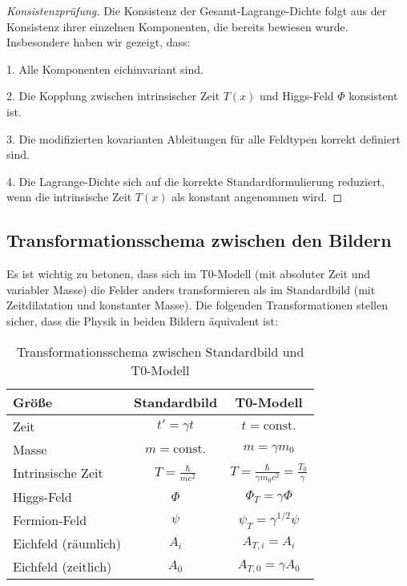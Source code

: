 \documentclass{article}
\theoremstyle{definition}
\theoremstyle{remark}
\newcommand{\Tfield}{T(x)} %
\begin{document}
		\begin{proof}[Konsistenzprüfung]
			Die Konsistenz der Gesamt-Lagrange-Dichte folgt aus der Konsistenz ihrer einzelnen Komponenten, die bereits bewiesen wurde. Insbesondere haben wir gezeigt, dass:
			
			1. Alle Komponenten eichinvariant sind.
			
			2. Die Kopplung zwischen intrinsischer Zeit $\Tfield$ und Higgs-Feld $\Phi$ konsistent ist.
			
			3. Die modifizierten kovarianten Ableitungen für alle Feldtypen korrekt definiert sind.
			
			4. Die Lagrange-Dichte sich auf die korrekte Standardformulierung reduziert, wenn die intrinsische Zeit $\Tfield$ als konstant angenommen wird.
		\end{proof}
		
		\subsection{Transformationsschema zwischen den Bildern}
		
		Es ist wichtig zu betonen, dass sich im T0-Modell (mit absoluter Zeit und variabler Masse) die Felder anders transformieren als im Standardbild (mit Zeitdilatation und konstanter Masse). Die folgenden Transformationen stellen sicher, dass die Physik in beiden Bildern äquivalent ist:
		
		\begin{table}[h]
			\centering
			\begin{tabular}{|l|c|c|}
				\hline
				\textbf{Größe} & \textbf{Standardbild} & \textbf{T0-Modell} \\
				\hline
				Zeit & $t' = \gamma t$ & $t = \text{const.}$ \\
				Masse & $m = \text{const.}$ & $m = \gamma m_0$ \\
				Intrinsische Zeit & $T = \frac{\hbar}{mc^2}$ & $T = \frac{\hbar}{\gamma m_0c^2} = \frac{T_0}{\gamma}$ \\
				Higgs-Feld & $\Phi$ & $\Phi_T = \gamma \Phi$ \\
				Fermion-Feld & $\psi$ & $\psi_T = \gamma^{1/2} \psi$ \\
				Eichfeld (räumlich) & $A_i$ & $A_{T,i} = A_i$ \\
				Eichfeld (zeitlich) & $A_0$ & $A_{T,0} = \gamma A_0$ \\
				\hline
			\end{tabular}
			\caption{Transformationsschema zwischen Standardbild und T0-Modell}
		\end{table}
		
\end{document}
